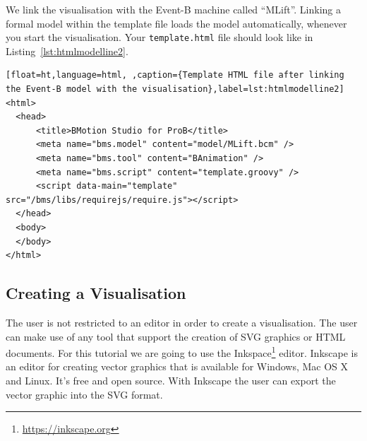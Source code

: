 We link the visualisation with the Event-B machine called ``MLift''.
Linking a formal model within the template file loads the model automatically, whenever you start the visualisation.
Your \texttt{template.html} file should look like in Listing~\ref{lst:htmlmodelline2}.

\begin{lstlisting}[float=ht,language=html, ,caption={Template HTML file after linking the Event-B model with the visualisation},label=lst:htmlmodelline2]
<html>
  <head>
      <title>BMotion Studio for ProB</title>
      <meta name="bms.model" content="model/MLift.bcm" />
      <meta name="bms.tool" content="BAnimation" />
      <meta name="bms.script" content="template.groovy" />
      <script data-main="template" src="/bms/libs/requirejs/require.js"></script>
  </head>
  <body>
  </body>
</html>
\end{lstlisting}


\subsection{Creating a Visualisation}

The user is not restricted to an editor in order to create a visualisation.
The user can make use of any tool that support the creation of SVG graphics or HTML documents.
For this tutorial we are going to use the Inkspace\footnote{\url{https://inkscape.org}} editor. Inkscape is an editor for creating vector graphics that is available for Windows, Mac OS X and Linux.
It's free and open source.
With Inkscape the user can export the vector graphic into the SVG format.


